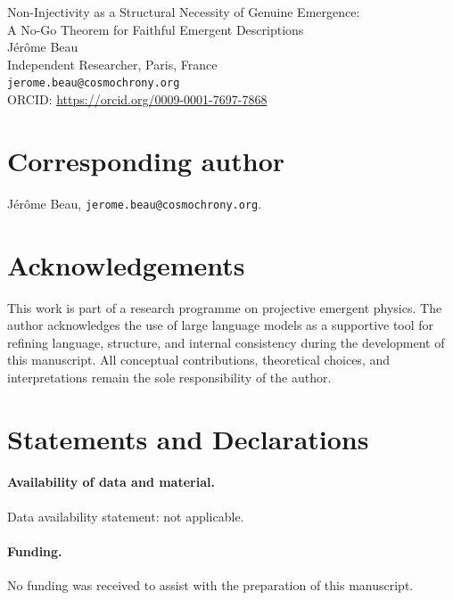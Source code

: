 \documentclass[12pt,a4paper]{article}
\begin{document}
  \begin{center}
    {\LARGE Non-Injectivity as a Structural Necessity of Genuine Emergence:\\[0.3em]
    A No-Go Theorem for Faithful Emergent Descriptions}\\[2em]

    {\large J\'er\^ome Beau}\\[0.5em]
    Independent Researcher, Paris, France\\
    \texttt{jerome.beau@cosmochrony.org}\\
    ORCID: \url{https://orcid.org/0009-0001-7697-7868}
  \end{center}

  \vspace{2em}

  \section*{Corresponding author}

  J\'er\^ome Beau, \texttt{jerome.beau@cosmochrony.org}.

  \section*{Acknowledgements}

  This work is part of a research programme on projective emergent physics.
  The author acknowledges the use of large language models as a supportive tool for refining language,
  structure, and internal consistency during the development of this manuscript.
  All conceptual contributions, theoretical choices, and interpretations remain the sole responsibility of the
  author.

  \section*{Statements and Declarations}

  \paragraph{Availability of data and material.}
  Data availability statement: not applicable.

  \paragraph{Funding.}
  No funding was received to assist with the preparation of this manuscript.
\end{document}
